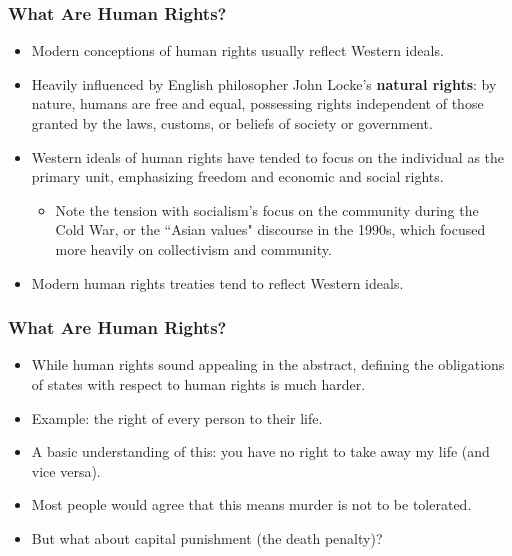 \documentclass{beamer}
\begin{document}
\begin{frame} 
	\frametitle{\LARGE{What Are Human Rights?}}
	\begin{itemize}
		\item Modern conceptions of human rights usually reflect Western ideals. \pause
		\item Heavily influenced by English philosopher John Locke's \textbf{natural rights}: by nature, humans are free and equal, possessing rights independent of those granted by the laws, customs, or beliefs of society or government. \pause
		\item Western ideals of human rights have tended to focus on the individual as the primary unit, emphasizing freedom and economic and social rights. \pause
		\begin{itemize}
			\item Note the tension with socialism's focus on the community during the Cold War, or the ``Asian values" discourse in the 1990s, which focused more heavily on collectivism and community. \pause
		\end{itemize}
		\item Modern human rights treaties tend to reflect Western ideals.		
	\end{itemize}
\end{frame}

\begin{frame} 
	\frametitle{\LARGE{What Are Human Rights?}}
	\begin{itemize}
		\item While human rights sound appealing in the abstract, defining the obligations of states with respect to human rights is much harder.
		\item Example: the right of every person to their life. \pause
		\item A basic understanding of this: you have no right to take away my life (and vice versa). \pause
		\item Most people would agree that this means murder is not to be tolerated. \pause
		\item But what about capital punishment (the death penalty)?	
	\end{itemize}
\end{frame}
\end{document}
